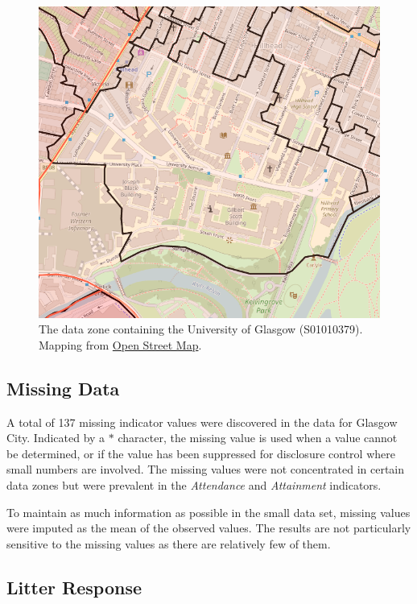 \documentclass{thesis}
\begin{document}
\begin{figure}[h]
    \centering
    \includegraphics[scale=0.5]{images/glasgow-uni-ward.PNG}
    \caption{The data zone containing the University of Glasgow (S01010379). Mapping from \href{https://www.openstreetmap.org}{Open Street Map}.}
    \label{fig:glasgow-uni-dz}
\end{figure}

\subsection*{Missing Data}

A total of 137 missing indicator values were discovered in the data for Glasgow City. Indicated by a $*$ character, the missing value is used when a value cannot be determined, or if the value has been suppressed for disclosure control where small numbers are involved. The missing values were not concentrated in certain data zones but were prevalent in the \textit{Attendance} and \textit{Attainment} indicators. 

To maintain as much information as possible in the small data set, missing values were imputed as the mean of the observed values. The results are not particularly sensitive to the missing values as there are relatively few of them.

\subsection*{Litter Response}
\end{document}
